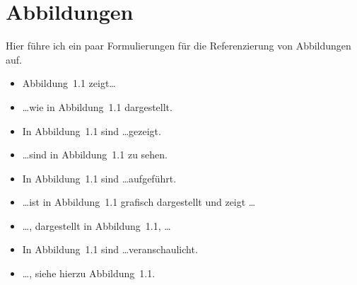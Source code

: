 \chapter{Abbildungen}
\label{sec:abbildungen}

Hier führe ich ein paar Formulierungen für die Referenzierung von Abbildungen auf. 

\begin{itemize}
	\item Abbildung~1.1 zeigt\dots
	\item \dots wie in Abbildung~1.1 dargestellt. 
	\item In Abbildung~1.1 sind \dots gezeigt. 
	\item \dots sind in Abbildung~1.1 zu sehen. 
	\item In Abbildung~1.1 sind \dots aufgeführt. 
	\item \dots ist in Abbildung~1.1 grafisch dargestellt und zeigt \dots
	\item \dots, dargestellt in Abbildung~1.1, \dots
	\item In Abbildung~1.1 sind \dots veranschaulicht. 
	\item \dots, siehe hierzu Abbildung~1.1.
\end{itemize}
